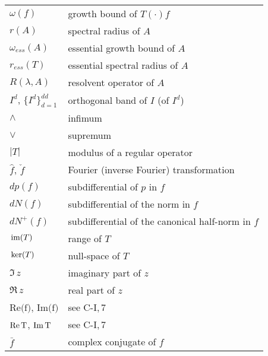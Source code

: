 \begin{longtable}{p{}p{}}
$\omega(f)$ & growth bound of $T(\cdot)f$ \\ %
$r(A)$ & spectral radius of $A$\\ %
$\omega_{ess}(A)$ & essential growth bound of $A$\\ %
$r_{ess}(T)$ & essential spectral radius of $A$\\ %
$R(\lambda,A)$ & resolvent operator of $A$\\ %
$I^{d}$, $\{I^{d}\}_{d=1}^{dd}$ & orthogonal band of $I$ (of $I^{d}$) \\ %
$\wedge$ & infimum \\ %
$\vee$ & supremum \\ %
$|T|$ & modulus of a regular operator \\ %
$\hat{f}$, $\check{f}$ & Fourier (inverse Fourier) transformation \\ %
$dp(f)$ & subdifferential of $p$ in $f$ \\ %
$dN(f)$ & subdifferential of the norm in $f$ \\ %
$dN^{+}(f)$ & subdifferential of the canonical half-norm in $f$ \\ %
$\mathop{}\mathrm{im}(T)$ & range of $T$\\ %
$\mathop{}\mathrm{ker}(T)$ & null-space of $T$\\ %
$\Im \, z$ & imaginary part of $z$ \\ %
$\Re \, z$ & real part of $z$\\ %
$\text{Re(f)}$, $\text{Im(f)}$ &  see C-I,\,7 \\ %
$\text{Re\,T}$, $\text{Im\,T}$ & see C-I,\,7 \\ %
$\bar{f}$ & complex conjugate of $f$ \\ %

\end{longtable}
